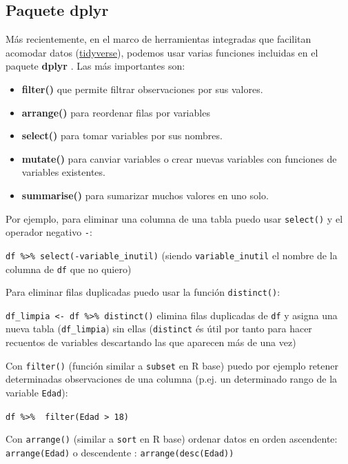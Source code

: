\documentclass[]{book}
\theoremstyle{definition}
\theoremstyle{definition}
\theoremstyle{remark}
\begin{document}
\subsection{Paquete dplyr}\label{paquete-dplyr}

Más recientemente, en el marco de herramientas integradas que facilitan
acomodar datos (\href{http://tidyverse.org/}{tidyverse}), podemos usar
varias funciones incluidas en el paquete \textbf{dplyr} \citep{R-dplyr}.
Las más importantes son:

\begin{itemize}
\item
  \textbf{filter()} que permite filtrar observaciones por sus valores.
\item
  \textbf{arrange()} para reordenar filas por variables
\item
  \textbf{select()} para tomar variables por sus nombres.
\item
  \textbf{mutate()} para canviar variables o crear nuevas variables con
  funciones de variables existentes.
\item
  \textbf{summarise()} para sumarizar muchos valores en uno solo.
\end{itemize}

Por ejemplo, para eliminar una columna de una tabla puedo usar
\texttt{select()} y el operador negativo \texttt{-}:

\texttt{df\ \%\textgreater{}\%\ select(-variable\_inutil)} (siendo
\texttt{variable\_inutil} el nombre de la columna de \texttt{df} que no
quiero)

Para eliminar filas duplicadas puedo usar la función
\texttt{distinct()}:

\texttt{df\_limpia\ \textless{}-\ df\ \%\textgreater{}\%\ distinct()}
elimina filas duplicadas de \texttt{df} y asigna una nueva tabla
(\texttt{df\_limpia}) sin ellas (\texttt{distinct} és útil por tanto
para hacer recuentos de variables descartando las que aparecen más de
una vez)

Con \texttt{filter()} (función similar a \texttt{subset} en R base)
puedo por ejemplo retener determinadas observaciones de una columna
(p.ej. un determinado rango de la variable \texttt{Edad}):

\texttt{df\ \%\textgreater{}\%\ \ filter(Edad\ \textgreater{}\ 18)}

Con \texttt{arrange()} (similar a \texttt{sort} en R base) ordenar datos
en orden ascendente: \texttt{arrange(Edad)} o descendente :
\texttt{arrange(desc(Edad))}
\end{document}
